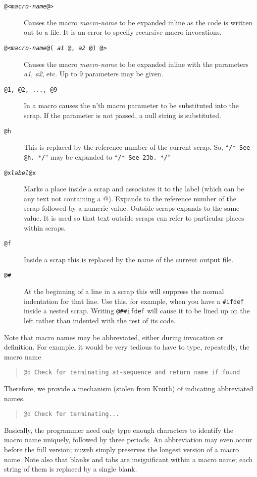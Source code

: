 \documentclass{report}
\begin{document}
\begin{description}
\item[\tt @<{\em macro-name\/}@>] Causes the macro 
  {\em macro-name\/} to be expanded inline as the code is written out
  to a file. It is an error to specify recursive macro invocations.
\item[\tt @<{\em macro-name\/}@( {\em a1} @, {\em a2} @) @>] Causes the macro 
  {\em macro-name\/} to be expanded inline with the parameters {\em a1},
    {\em a2}, etc. Up to 9 parameters may be given.
\item[\tt @1, @2, ..., @9] In a macro causes the n'th macro 
      parameter to be substituted into the scrap.  If the parameter
      is not passed, a null string is substituted.
\item[\tt @h] This is replaced by the reference number of the current scrap.
So, ``\verb+/* See @h. */+'' may be expanded to ``\verb+/* See 23b. */+''
\item[\tt @x{\em label}@x] Marks a place inside a scrap and
associates it to the label (which can be any text not containing
a @). Expands to the reference number of the scrap followed by a
numeric value. Outside scraps expands to the same value. It is
used so that text outside scraps can refer to particular places
within scraps. 
\item[\tt @f] Inside a scrap this is replaced by the name of the
current output file.
\item[\tt @\#] At the beginning of a line in a scrap this will
suppress the normal indentation for that line. Use this, for
example, when you have a \verb|#ifdef| inside a nested scrap.
Writing \verb|@##ifdef| will cause it to be lined up on the left
rather than indented with the rest of its code.
\end{description}
Note that macro names may be abbreviated, either during invocation or
definition. For example, it would be very tedious to have to
type, repeatedly, the macro name
\begin{quote}
\verb|@d Check for terminating at-sequence and return name if found|
\end{quote}
Therefore, we provide a mechanism (stolen from Knuth) of indicating
abbreviated names.
\begin{quote}
\verb|@d Check for terminating...|
\end{quote}
Basically, the programmer need only type enough characters to
identify the macro name uniquely, followed by three periods. An abbreviation
may even occur before the full version; nuweb simply preserves the
longest version of a macro name. Note also that blanks and tabs are
insignificant within a macro name; each string of them is replaced by a
single blank.
\end{document}
